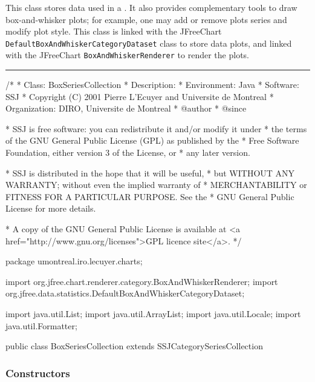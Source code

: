 
This class stores data used in a 
.
It also provides complementary tools to draw
 box-and-whisker plots; for example, one may
add or remove plots series and modify plot style. This class is linked with 
the JFreeChart \texttt{DefaultBoxAndWhiskerCategoryDataset} class to store 
data plots, and linked with the JFreeChart
\texttt{BoxAndWhiskerRenderer} to render the plots.

\bigskip\hrule
\begin{code}
\begin{hide}
/*
 * Class:        BoxSeriesCollection
 * Description:  
 * Environment:  Java
 * Software:     SSJ 
 * Copyright (C) 2001  Pierre L'Ecuyer and Universite de Montreal
 * Organization: DIRO, Universite de Montreal
 * @author       
 * @since

 * SSJ is free software: you can redistribute it and/or modify it under
 * the terms of the GNU General Public License (GPL) as published by the
 * Free Software Foundation, either version 3 of the License, or
 * any later version.

 * SSJ is distributed in the hope that it will be useful,
 * but WITHOUT ANY WARRANTY; without even the implied warranty of
 * MERCHANTABILITY or FITNESS FOR A PARTICULAR PURPOSE.  See the
 * GNU General Public License for more details.

 * A copy of the GNU General Public License is available at
   <a href="http://www.gnu.org/licenses">GPL licence site</a>.
 */
\end{hide}
package umontreal.iro.lecuyer.charts;\begin{hide}

import   org.jfree.chart.renderer.category.BoxAndWhiskerRenderer;
import   org.jfree.data.statistics.DefaultBoxAndWhiskerCategoryDataset;

import   java.util.List;
import   java.util.ArrayList;
import   java.util.Locale;
import   java.util.Formatter;
\end{hide}

public class BoxSeriesCollection extends SSJCategorySeriesCollection \begin{hide} {
   final double BARWIDTH = 0.1;
\end{hide}
\end{code}

\subsubsection*{Constructors}

